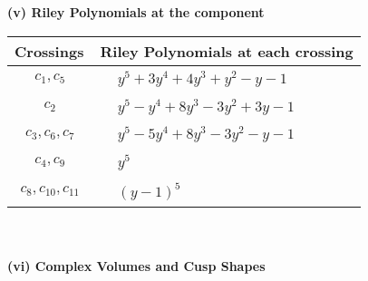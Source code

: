 \documentclass[1p]{elsarticle_modified}
\theoremstyle{definition}
\begin{document}
\newpage\renewcommand{\arraystretch}{1}
\flushleft \textbf{(v) Riley Polynomials at the component}\newline \\
\begin{tabular}{m{50pt}|m{274pt}}
Crossings & \hspace{64pt}Riley Polynomials at each crossing \\
\hline $$\begin{aligned}c_{1},c_{5}\end{aligned}$$&$\begin{aligned}
&y^5+3 y^4+4 y^3+y^2- y-1
\end{aligned}$\\
\hline $$\begin{aligned}c_{2}\end{aligned}$$&$\begin{aligned}
&y^5- y^4+8 y^3-3 y^2+3 y-1
\end{aligned}$\\
\hline $$\begin{aligned}c_{3},c_{6},c_{7}\end{aligned}$$&$\begin{aligned}
&y^5-5 y^4+8 y^3-3 y^2- y-1
\end{aligned}$\\
\hline $$\begin{aligned}c_{4},c_{9}\end{aligned}$$&$\begin{aligned}
&y^5
\end{aligned}$\\
\hline $$\begin{aligned}c_{8},c_{10},c_{11}\end{aligned}$$&$\begin{aligned}
&(y-1)^5
\end{aligned}$\\
\hline
\end{tabular}\\~\\
\newpage\flushleft \textbf{(vi) Complex Volumes and Cusp Shapes}
\end{document}
